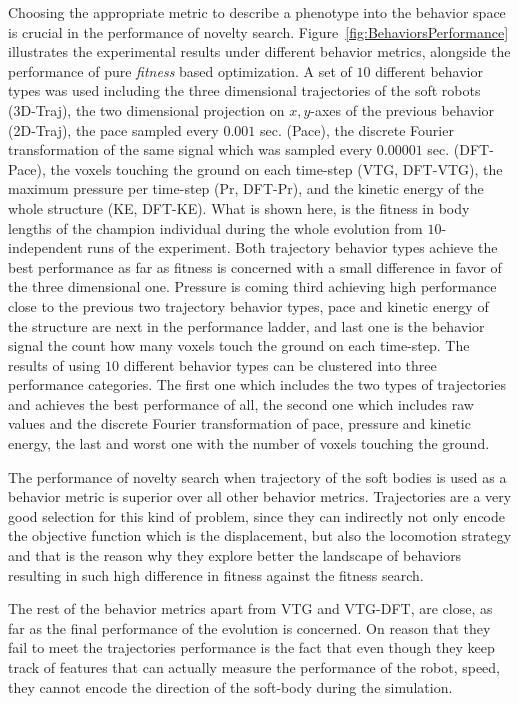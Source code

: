 Choosing the appropriate metric to describe a phenotype into the behavior space is crucial in the performance of novelty search. Figure~\ref{fig:BehaviorsPerformance} illustrates the experimental results under different behavior metrics, alongside the performance of pure \emph{fitness} based optimization. A set of $10$ different behavior types was used including the three dimensional trajectories of the soft robots (3D-Traj), the two dimensional projection on $x,y$-axes of the previous behavior (2D-Traj), the pace sampled every $0.001$ sec. (Pace), the discrete Fourier transformation of the same signal which was sampled every $0.00001$ sec. (DFT-Pace), the voxels touching the ground on each time-step (VTG, DFT-VTG), the maximum pressure per time-step (Pr, DFT-Pr), and the kinetic energy of the whole structure (KE, DFT-KE). What is shown here, is the fitness in body lengths of the champion individual during the whole evolution from $10$-independent runs of the experiment. Both trajectory behavior types achieve the best performance as far as fitness is concerned with a small difference in favor of the three dimensional one. Pressure is coming third achieving high performance close to the previous two trajectory behavior types, pace and kinetic energy of the structure are next in the performance ladder, and last one is the behavior signal the count how many voxels touch the ground on each time-step. The results of using $10$ different behavior types can be clustered into three performance categories. The first one which includes the two types of trajectories and achieves the best performance of all, the second one which includes raw values and the discrete Fourier transformation of pace, pressure and kinetic energy, the last and worst one with the number of voxels touching the ground. 

The performance of novelty search when trajectory of the soft bodies is used as a behavior metric is superior over all other behavior metrics. Trajectories are a very good selection for this kind of problem, since they can indirectly not only encode the objective function which is the displacement, but also the locomotion strategy and that is the reason why they explore better the landscape of behaviors resulting in such high difference in fitness against the fitness search. 

The rest of the behavior metrics apart from VTG and VTG-DFT, are close, as far as the final performance of the evolution is concerned. On reason that they fail to meet the trajectories performance is the fact that even though they keep track of features that can actually measure the performance of the robot, speed, they cannot encode the direction of the soft-body during the simulation. 

